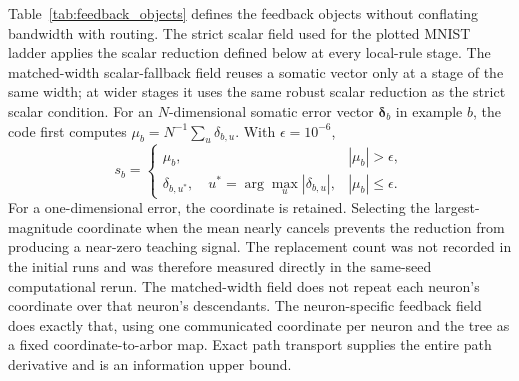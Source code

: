 Table~\ref{tab:feedback_objects} defines the feedback objects without
conflating bandwidth with routing. The strict scalar field used for the
plotted MNIST ladder applies the scalar reduction defined below at every
local-rule stage. The matched-width scalar-fallback field
reuses a somatic vector only at a stage of the same width; at wider stages it
uses the same robust scalar reduction as the strict scalar condition. For an
$N$-dimensional somatic error vector $\bm\delta_b$ in example $b$, the code
first computes $\mu_b=N^{-1}\sum_u\delta_{b,u}$. With $\epsilon=10^{-6}$,
\begin{equation}
s_b=
\begin{cases}
\mu_b, & |\mu_b|>\epsilon,\\
\delta_{b,u^*},\quad u^*=\arg\max_u|\delta_{b,u}|, & |\mu_b|\leq\epsilon.
\end{cases}
\label{eq:s_scalar_reduction}
\end{equation}
For a one-dimensional error, the coordinate is retained. Selecting the
largest-magnitude coordinate when the mean nearly cancels prevents the
reduction from producing a near-zero teaching signal. The
replacement count was not recorded in the initial runs and was therefore
measured directly in the same-seed computational rerun. The matched-width field does not repeat each
neuron's coordinate over that neuron's descendants. The neuron-specific feedback field
does exactly that, using one communicated coordinate per neuron and the tree as
a fixed coordinate-to-arbor map. Exact path transport supplies the entire path derivative and
is an information upper bound.

